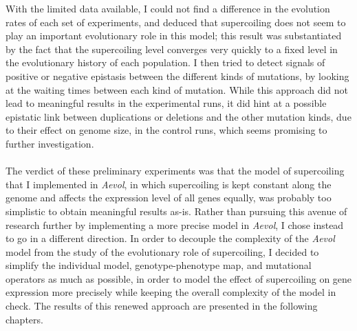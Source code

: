With the limited data available, I could not find a difference in the evolution rates of each set of experiments, and deduced that supercoiling does not seem to play an important evolutionary role in this model; this result was substantiated by the fact that the supercoiling level converges very quickly to a fixed level in the evolutionary history of each population.
I then tried to detect signals of positive or negative epistasis between the different kinds of mutations, by looking at the waiting times between each kind of mutation.
While this approach did not lead to meaningful results in the experimental runs, it did hint at a possible epistatic link between duplications or deletions and the other mutation kinds, due to their effect on genome size, in the control runs, which seems promising to further investigation.

\paragraph{}
The verdict of these preliminary experiments was that the model of supercoiling that I implemented in \emph{Aevol}, in which supercoiling is kept constant along the genome and affects the expression level of all genes equally, was probably too simplistic to obtain meaningful results as-is.
Rather than pursuing this avenue of research further by implementing a more precise model in \emph{Aevol}, I chose instead to go in a different direction.
In order to decouple the complexity of the \emph{Aevol} model from the study of the evolutionary role of supercoiling, I decided to simplify the individual model, genotype-phenotype map, and mutational operators as much as possible, in order to model the effect of supercoiling on gene expression more precisely while keeping the overall complexity of the model in check.
The results of this renewed approach are presented in the following chapters.